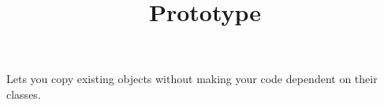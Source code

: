 \documentclass[a4paper]{article}
\title{Prototype}
\date{}
\begin{document}
    \maketitle
    Lets you copy existing objects without making your code dependent on their classes.
\end{document}

